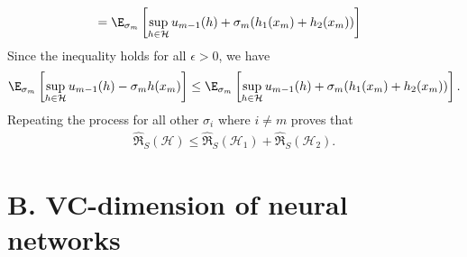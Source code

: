 \begin{enumerate}
\begin{align}
        &= \E_{\sigma_m}\left[
        \sup_{h\in \mathcal{H}} u_{m-1}(h) +
        \sigma_m(h_1(x_m)+h_2(x_m))
        \right]
        \nonumber
    \end{align}
    Since the inequality holds for all $\epsilon>0$,
    we have 
    \begin{align}
        \E_{\sigma_m} \left[
        \sup_{h \in \mathcal{H}}
        u_{m-1}(h) - \sigma_m h(x_m)
        \right] \leq
        \E_{\sigma_m}\left[
        \sup_{h\in \mathcal{H}} u_{m-1}(h) +
        \sigma_m(h_1(x_m)+h_2(x_m))
        \right].
        \nonumber
    \end{align}
    Repeating the process for all other $\sigma_i$ where
    $i\neq m$ proves that
    \begin{align}
        \hat{\mathfrak{R}}_S(\mathcal{H}) \leq 
        \hat{\mathfrak{R}}_S(\mathcal{H}_1) +
        \hat{\mathfrak{R}}_S(\mathcal{H}_2).
        \nonumber
    \end{align}

\end{enumerate}

\medskip
\section*{B. VC-dimension of neural networks}
\medskip

